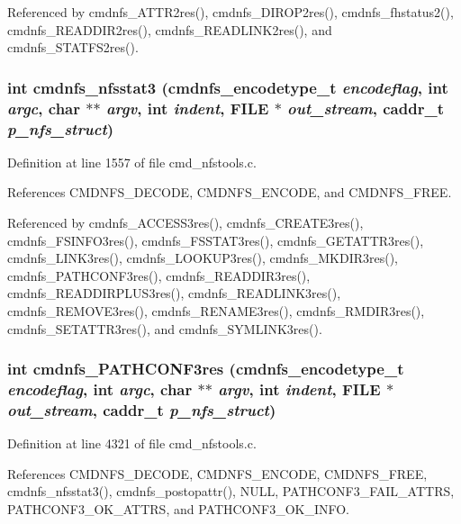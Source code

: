 Referenced by cmdnfs\_\-ATTR2res(), cmdnfs\_\-DIROP2res(), cmdnfs\_\-fhstatus2(), cmdnfs\_\-READDIR2res(), cmdnfs\_\-READLINK2res(), and cmdnfs\_\-STATFS2res().
\subsubsection{\setlength{\rightskip}{0pt plus 5cm}int cmdnfs\_\-nfsstat3 ({\bf cmdnfs\_\-encodetype\_\-t} {\em encodeflag}, int {\em argc}, char $\ast$$\ast$ {\em argv}, int {\em indent}, FILE $\ast$ {\em out\_\-stream}, caddr\_\-t {\em p\_\-nfs\_\-struct})}\label{cmd__nfstools_8h_a34}




Definition at line 1557 of file cmd\_\-nfstools.c.

References CMDNFS\_\-DECODE, CMDNFS\_\-ENCODE, and CMDNFS\_\-FREE.

Referenced by cmdnfs\_\-ACCESS3res(), cmdnfs\_\-CREATE3res(), cmdnfs\_\-FSINFO3res(), cmdnfs\_\-FSSTAT3res(), cmdnfs\_\-GETATTR3res(), cmdnfs\_\-LINK3res(), cmdnfs\_\-LOOKUP3res(), cmdnfs\_\-MKDIR3res(), cmdnfs\_\-PATHCONF3res(), cmdnfs\_\-READDIR3res(), cmdnfs\_\-READDIRPLUS3res(), cmdnfs\_\-READLINK3res(), cmdnfs\_\-REMOVE3res(), cmdnfs\_\-RENAME3res(), cmdnfs\_\-RMDIR3res(), cmdnfs\_\-SETATTR3res(), and cmdnfs\_\-SYMLINK3res().
\subsubsection{\setlength{\rightskip}{0pt plus 5cm}int cmdnfs\_\-PATHCONF3res ({\bf cmdnfs\_\-encodetype\_\-t} {\em encodeflag}, int {\em argc}, char $\ast$$\ast$ {\em argv}, int {\em indent}, FILE $\ast$ {\em out\_\-stream}, caddr\_\-t {\em p\_\-nfs\_\-struct})}\label{cmd__nfstools_8h_a65}




Definition at line 4321 of file cmd\_\-nfstools.c.

References CMDNFS\_\-DECODE, CMDNFS\_\-ENCODE, CMDNFS\_\-FREE, cmdnfs\_\-nfsstat3(), cmdnfs\_\-postopattr(), NULL, PATHCONF3\_\-FAIL\_\-ATTRS, PATHCONF3\_\-OK\_\-ATTRS, and PATHCONF3\_\-OK\_\-INFO.
